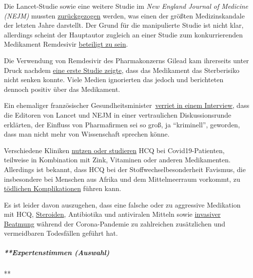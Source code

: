 Die Lancet-Studie sowie eine weitere Studie im \emph{New England Journal
of Medicine (NEJM)} mussten
\href{https://www.bloomberg.com/news/articles/2020-06-04/researchers-retract-lancet-study-linking-malaria-drug-to-risks}{zurückgezogen}
werden, was einen der größten Medizinskandale der letzten Jahre
darstellt. Der Grund für die manipulierte Studie ist nicht klar,
allerdings scheint der Hauptautor zugleich an einer Studie zum
konkurrierenden Medikament Remdesivir
\href{https://www.medicineuncensored.com/a-study-out-of-thin-air}{beteiligt
zu sein}.

Die Verwendung von Remdesivir des Pharmakonzerns Gilead kam ihrerseits
unter Druck nachdem
\href{https://edition.cnn.com/2020/05/22/health/remdesivir-covid-19-trial-results-nejm-study/index.html}{eine
erste Studie zeigte}, dass das Medikament das Sterberisiko nicht senken
konnte. Viele Medien ignorierten das jedoch und berichteten dennoch
positiv über das Medikament.

Ein ehemaliger französischer
Gesundheitsminister~\href{https://www.youtube.com/watch?v=ZYgiCALEdpE}{verriet
in einem Interview}, dass die Editoren von Lancet und NEJM in einer
vertraulichen Diskussionsrunde erklärten, der Einfluss von Pharmafirmen
sei so groß, ja ``kriminell'', geworden, dass man nicht mehr von
Wissenschaft sprechen könne.

Verschiedene Kliniken
\href{https://www.webmd.com/lung/news/20200409/chloroquine-zinc-tested-to-block-covid-infection}{nutzen
oder studieren} HCQ bei Covid19-Patienten, teilweise in Kombination mit
Zink, Vitaminen oder anderen Medikamenten. Allerdings ist bekannt, dass
HCQ bei der Stoffwechselbesonderheit Favismus, die insbesondere bei
Menschen aus Afrika und dem Mittelmeerraum vorkommt, zu
\href{https://off-guardian.org/2020/05/13/covid19-a-case-for-medical-detectives/}{tödlichen
Komplikationen} führen kann.

Es ist leider davon auszugehen, dass eine falsche oder zu aggressive
Medikation mit HCQ,
\href{https://www.sciencedaily.com/releases/2020/02/200206110703.htm}{Steroiden},
Antibiotika und antiviralen Mitteln sowie
\href{https://nypost.com/2020/05/29/northwell-health-probing-use-of-ventilators-for-covid-patients/}{invasiver
Beatmung} während der Corona-Pandemie zu zahlreichen zusätzlichen und
vermeidbaren Todesfällen geführt hat.

\hypertarget{expertenstimmen-auswahl}{%
\subparagraph{**Expertenstimmen
(Auswahl)}\label{expertenstimmen-auswahl}}

**


